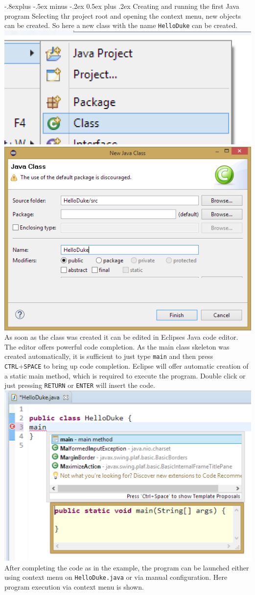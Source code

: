 \documentclass[10pt,landscape,a4paper]{article}
\makeatletter
\renewcommand{\subsection}{\@startsection{subsection}{2}{0mm}%
                                {-.8explus -.5ex minus -.2ex}%
                                {0.5ex plus .2ex}%
                                {\normalfont\normalsize\bfseries}}
\makeatother
\begin{document}
\begin{multicols}{2}
\subsection{Creating and running the first Java program}
Selecting thr project root and opening the context menu, new objects can be created. So here a new class with the name \texttt{HelloDuke} can be created.\\
\includegraphics[width=.3\linewidth]{../slides/ContextMenu_CreateClass.png} 
\includegraphics[width=.5\linewidth]{../slides/EclipseProjectExplorerNewClass2.png}\\
As soon as the class was created it can be edited in Eclipses Java code editor. The editor offers powerful code completion. As the main class skeleton was created automatically, it is sufficient to just type \texttt{main} and then press \texttt{CTRL}+\texttt{SPACE} to bring up code completion. Eclipse will offer automatic creation of a static main method, which is required to execute the program. Double click or just pressing \texttt{RETURN} or \texttt{ENTER} will insert the code.\\
\includegraphics[width=.5\linewidth]{../slides/CodeCompletion_MainMethod.png}\\
After completing the code as in the example, the program can be launched either using context menu on \texttt{HelloDuke.java} or via manual configuration. Here program execution via context menu is shown.\\

\end{multicols}
\end{document}
